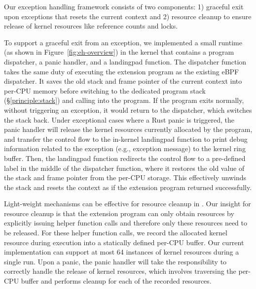 Our exception handling framework consists of two components: 1) graceful exit
    upon exceptions that resets the current context and 2) resource cleanup to
    ensure release of kernel resources like reference counts and locks.

To support a graceful exit from an exception, we implemented a small runtime
    (as shown in Figure~\ref{fig:eh-overview}) in the kernel that contains a
    program dispatcher, a panic handler, and a landingpad function.
The dispatcher function takes the same duty of executing the extension program
    as the existing eBPF dispatcher.
It saves the old stack and frame pointer of the current context into per-CPU
    memory before switching to the dedicated program stack
    (\S\ref{principle:stack}) and calling into the program.
If the program exits normally, without triggering an exception, it would
    return to the dispatcher, which switches the stack back.
Under exceptional cases where a Rust panic is triggered, the panic handler will
    release the kernel resources currently allocated by the program, and
    transfer the control flow to the in-kernel landingpad function to print
    debug information related to the exception (e.g., exception message) to the
    kernel ring buffer.
Then, the landingpad function redirects the control flow to a pre-defined label
    in the middle of the dispatcher function, where it restores the old value
    of the stack and frame pointer from the per-CPU storage.
This effectively unwinds the stack and resets the context as if the extension
    program returned successfully.

Light-weight mechanisms can be effective for resource cleanup in \projname{}.
Our insight for resource cleanup is that the extension program can only obtain
    resources by explicitly issuing helper function calls and therefore only
    these resources need to be released.
For these helper function calls, we record the allocated kernel resource during
    execution into a statically defined per-CPU buffer.
Our current implementation can support at most 64
    instances of kernel resources during a single run.
Upon a panic, the panic handler will take the responsibility to correctly
    handle the release of kernel resources, which involves traversing the
    per-CPU buffer and performs cleanup for each of the recorded resources.


